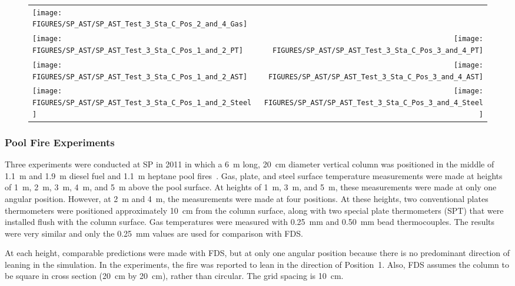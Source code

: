 \begin{figure}[p]
\begin{tabular*}{\textwidth}{l@{\extracolsep{\fill}}r}
\texttt{[image: FIGURES/SP\_AST/SP\_AST\_Test\_3\_Sta\_C\_Pos\_2\_and\_4\_Gas]} &
  \\
\texttt{[image: FIGURES/SP\_AST/SP\_AST\_Test\_3\_Sta\_C\_Pos\_1\_and\_2\_PT]} &
\texttt{[image: FIGURES/SP\_AST/SP\_AST\_Test\_3\_Sta\_C\_Pos\_3\_and\_4\_PT]} \\
\texttt{[image: FIGURES/SP\_AST/SP\_AST\_Test\_3\_Sta\_C\_Pos\_1\_and\_2\_AST]} &
\texttt{[image: FIGURES/SP\_AST/SP\_AST\_Test\_3\_Sta\_C\_Pos\_3\_and\_4\_AST]} \\
\texttt{[image: FIGURES/SP\_AST/SP\_AST\_Test\_3\_Sta\_C\_Pos\_1\_and\_2\_Steel]} &
\texttt{[image: FIGURES/SP\_AST/SP\_AST\_Test\_3\_Sta\_C\_Pos\_3\_and\_4\_Steel]}
\end{tabular*}
\label{SP_Test_3_Station_C}
\end{figure}

\clearpage



\subsubsection{Pool Fire Experiments}

Three experiments were conducted at SP in 2011 in which a 6~m long, 20~cm diameter vertical column was positioned in the middle of 1.1~m and 1.9~m diesel fuel and 1.1~m heptane
pool fires~\cite{Sjostrom:AST}. Gas, plate, and steel surface temperature measurements were made at heights of 1~m, 2~m, 3~m, 4~m, and 5~m above the pool surface. At heights of 1~m, 3~m, and 5~m, these measurements were made at only one angular position. However, at 2~m and 4~m, the measurements were made at four positions. At these heights, two conventional plates thermometers were positioned approximately 10~cm from the column surface, along with two special plate thermometers (SPT) that were installed flush with the column surface. Gas temperatures were measured with 0.25~mm and 0.50~mm bead thermocouples. The results were very similar and only the 0.25~mm values are used for comparison with FDS.

At each height, comparable predictions were made with FDS, but at only one angular position because there is no predominant direction of leaning in the simulation. In the experiments, the fire was reported to lean in the direction of Position~1. Also, FDS assumes the column to be square in cross section (20~cm by 20~cm), rather than circular. The grid spacing is 10~cm.

